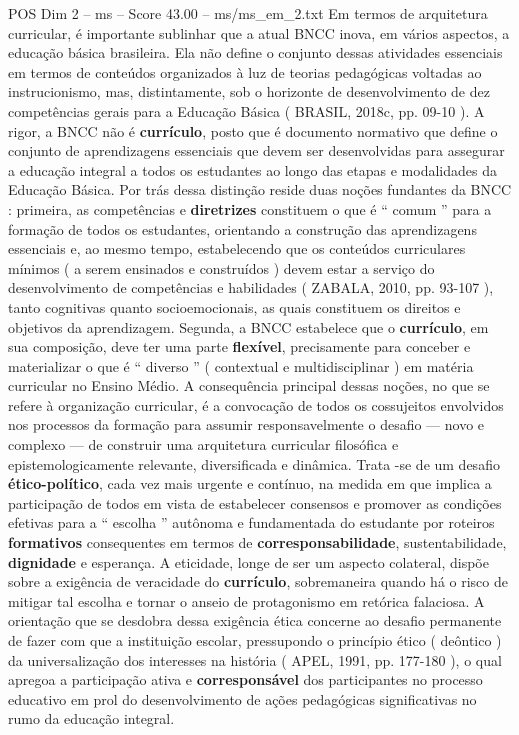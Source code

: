 \begin{textsample}{POS Dim 2 – ms – Score 43.00 – ms/ms\_em\_2.txt}
Em termos de arquitetura curricular, é importante sublinhar que a atual BNCC inova, em vários aspectos, a educação básica brasileira.
Ela não define o conjunto dessas atividades essenciais em termos de conteúdos organizados à luz de teorias pedagógicas voltadas ao instrucionismo, mas, distintamente, sob o horizonte de desenvolvimento de dez competências gerais para a Educação Básica ( BRASIL, 2018c, pp. 09-10 ).
A rigor, a BNCC não é \textbf{currículo}, posto que é documento normativo que define o conjunto de aprendizagens essenciais que devem ser desenvolvidas para assegurar a educação integral a todos os estudantes ao longo das etapas e modalidades da Educação Básica.
Por trás dessa distinção reside duas noções fundantes da BNCC : primeira, as competências e \textbf{diretrizes} constituem o que é “ comum ” para a formação de todos os estudantes, orientando a construção das aprendizagens essenciais e, ao mesmo tempo, estabelecendo que os conteúdos curriculares mínimos ( a serem ensinados e construídos ) devem estar a serviço do desenvolvimento de competências e habilidades ( ZABALA, 2010, pp. 93-107 ), tanto cognitivas quanto socioemocionais, as quais constituem os direitos e objetivos da aprendizagem.
Segunda, a BNCC estabelece que o \textbf{currículo}, em sua composição, deve ter uma parte \textbf{flexível}, precisamente para conceber e materializar o que é “ diverso ” ( contextual e multidisciplinar ) em matéria curricular no Ensino Médio.
A consequência principal dessas noções, no que se refere à organização curricular, é a convocação de todos os cossujeitos envolvidos nos processos da formação para assumir responsavelmente o desafio — novo e complexo — de construir uma arquitetura curricular filosófica e epistemologicamente relevante, diversificada e dinâmica.
Trata -se de um desafio \textbf{ético-político}, cada vez mais urgente e contínuo, na medida em que implica a participação de todos em vista de estabelecer consensos e promover as condições efetivas para a “ escolha ” autônoma e fundamentada do estudante por roteiros \textbf{formativos} consequentes em termos de \textbf{corresponsabilidade}, sustentabilidade, \textbf{dignidade} e esperança.
A eticidade, longe de ser um aspecto colateral, dispõe sobre a exigência de veracidade do \textbf{currículo}, sobremaneira quando há o risco de mitigar tal escolha e tornar o anseio de protagonismo em retórica falaciosa.
A orientação que se desdobra dessa exigência ética concerne ao desafio permanente de fazer com que a instituição escolar, pressupondo o princípio ético ( deôntico ) da universalização dos interesses na história ( APEL, 1991, pp. 177-180 ), o qual apregoa a participação ativa e \textbf{corresponsável} dos participantes no processo educativo em prol do desenvolvimento de ações pedagógicas significativas no rumo da educação integral.

\end{textsample}
